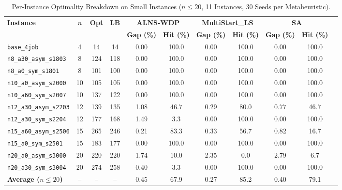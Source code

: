 \documentclass[journal]{IEEEtran}
\begin{document}
\begin{table}[htbp]
\centering
\small
\caption{Per-Instance Optimality Breakdown on Small Instances ($n \le 20$, 11 Instances, 30 Seeds per Metaheuristic).}
\label{tab:small_instances}
\begin{tabular}{lcccccccccc}
\toprule
\textbf{Instance} & $n$ & \textbf{Opt} & \textbf{LB} & \multicolumn{2}{c}{\textbf{ALNS-WDP}} & \multicolumn{2}{c}{\textbf{MultiStart\_LS}} & \multicolumn{2}{c}{\textbf{SA}} \\
\cmidrule(lr){5-6} \cmidrule(lr){7-8} \cmidrule(lr){9-10}
& & & & \textbf{Gap (\%)} & \textbf{Hit (\%)} & \textbf{Gap (\%)} & \textbf{Hit (\%)} & \textbf{Gap (\%)} & \textbf{Hit (\%)} \\
\midrule
\texttt{base\_4job} & 4 & 14 & 14 & 0.00 & 100.0 & 0.00 & 100.0 & 0.00 & 100.0 \\
\texttt{n8\_a30\_asym\_s1803} & 8 & 124 & 118 & 0.00 & 100.0 & 0.00 & 100.0 & 0.00 & 100.0 \\
\texttt{n8\_a0\_sym\_s1801} & 8 & 101 & 100 & 0.00 & 100.0 & 0.00 & 100.0 & 0.00 & 100.0 \\
\texttt{n10\_a0\_asym\_s2000} & 10 & 105 & 105 & 0.00 & 100.0 & 0.00 & 100.0 & 0.00 & 100.0 \\
\texttt{n10\_a60\_sym\_s2007} & 10 & 137 & 122 & 0.00 & 100.0 & 0.00 & 100.0 & 0.00 & 100.0 \\
\texttt{n12\_a30\_asym\_s2203} & 12 & 139 & 135 & 1.08 & 46.7 & 0.29 & 80.0 & 0.77 & 46.7 \\
\texttt{n12\_a30\_sym\_s2204} & 12 & 177 & 168 & 1.49 & 3.3 & 0.00 & 100.0 & 0.00 & 100.0 \\
\texttt{n15\_a60\_asym\_s2506} & 15 & 265 & 246 & 0.21 & 83.3 & 0.33 & 56.7 & 0.82 & 16.7 \\
\texttt{n15\_a0\_sym\_s2501} & 15 & 183 & 177 & 0.00 & 100.0 & 0.00 & 100.0 & 0.00 & 100.0 \\
\texttt{n20\_a0\_asym\_s3000} & 20 & 220 & 220 & 1.74 & 10.0 & 2.35 & 0.0 & 2.79 & 6.7 \\
\texttt{n20\_a30\_sym\_s3004} & 20 & 274 & 258 & 0.40 & 3.3 & 0.00 & 100.0 & 0.00 & 100.0 \\
\midrule
\textbf{Average ($n \le 20$)} & -- & -- & -- & 0.45 & 67.9 & 0.27 & 85.2 & 0.40 & 79.1 \\
\bottomrule
\end{tabular}
\end{table}
\end{document}
